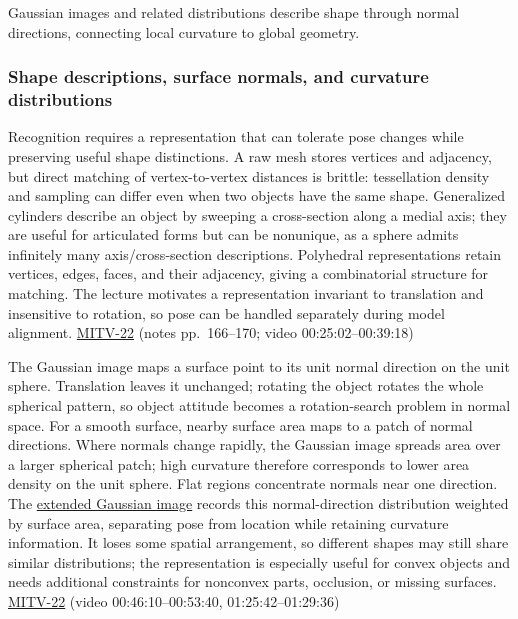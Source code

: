 Gaussian images and related distributions describe shape through normal directions, connecting local curvature to global geometry.

\subsubsection{Shape descriptions, surface normals, and curvature distributions}\label{shape-descriptions-surface-normals-and-curvature-distributions}

Recognition requires a representation that can tolerate pose changes while preserving useful shape distinctions. A raw mesh stores vertices and adjacency, but direct matching of vertex-to-vertex distances is brittle: tessellation density and sampling can differ even when two objects have the same shape. Generalized cylinders describe an object by sweeping a cross-section along a medial axis; they are useful for articulated forms but can be nonunique, as a sphere admits infinitely many axis/cross-section descriptions. Polyhedral representations retain vertices, edges, faces, and their adjacency, giving a combinatorial structure for matching. The lecture motivates a representation invariant to translation and insensitive to rotation, so pose can be handled separately during model alignment. \hyperref[04-visual-computing-ii-ch036]{MITV-22} (notes pp.~166--170; video 00:25:02--00:39:18)

The Gaussian image maps a surface point to its unit normal direction on the unit sphere. Translation leaves it unchanged; rotating the object rotates the whole spherical pattern, so object attitude becomes a rotation-search problem in normal space. For a smooth surface, nearby surface area maps to a patch of normal directions. Where normals change rapidly, the Gaussian image spreads area over a larger spherical patch; high curvature therefore corresponds to lower area density on the unit sphere. Flat regions concentrate normals near one direction. The \hyperref[appendix-89b2d5b7c9e1]{extended Gaussian image} records this normal-direction distribution weighted by surface area, separating pose from location while retaining curvature information. It loses some spatial arrangement, so different shapes may still share similar distributions; the representation is especially useful for convex objects and needs additional constraints for nonconvex parts, occlusion, or missing surfaces. \hyperref[04-visual-computing-ii-ch036]{MITV-22} (video 00:46:10--00:53:40, 01:25:42--01:29:36)

